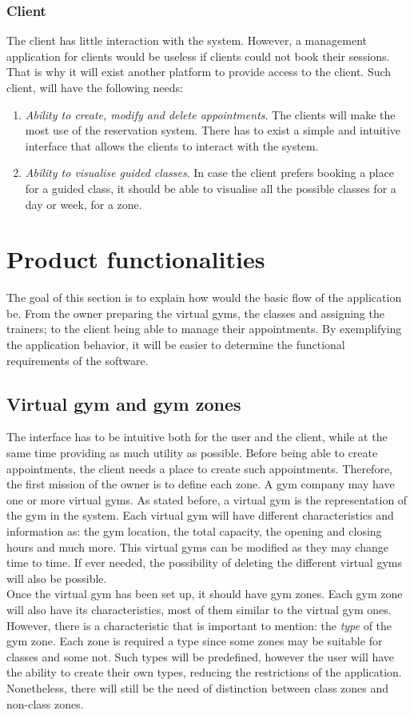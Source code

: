 \documentclass[a4paper,12pt]{book}
\begin{document}
\subsubsection{Client}
The client has little interaction with the system. However, a management application for clients would be useless if clients could not book their sessions. That is why it will exist another platform to provide access to the client. Such client, will have the following needs:
\begin{enumerate}[label = -]
	\item \emph{Ability to create, modify and delete appointments}. The clients will make the most use of the reservation system. There has to exist a simple and intuitive interface that allows the clients to interact with the system.
	\item \emph{Ability to visualise guided classes}. In case the client prefers booking a place for a guided class, it should be able to visualise all the possible classes for a day or week, for a zone.
\end{enumerate}
\section{Product functionalities}
The goal of this section is to explain how would the basic flow of the application be. From the owner preparing the virtual gyms, the classes and assigning the trainers; to the client being able to manage their appointments. By exemplifying the application behavior, it will be easier to determine the functional requirements of the software.
\subsection{Virtual gym and gym zones}
The interface has to be intuitive both for the user and the client, while at the same time providing as much utility as possible. Before being able to create appointments, the client needs a place to create such appointments. Therefore, the first mission of the owner is to define each zone. A gym company may have one or more virtual gyms. As stated before, a virtual gym is the representation of the gym in the system. Each virtual gym will have different characteristics and information as: the gym location, the total capacity, the opening and closing hours and much more. This virtual gyms can be modified as they may change time to time. If ever needed, the possibility of deleting the different virtual gyms will also be possible.
\\[8pt]
Once the virtual gym has been set up, it should have gym zones. Each gym zone will also have its characteristics, most of them similar to the virtual gym ones. However, there is a characteristic that is important to mention: the \emph{type} of the gym zone. Each zone is required a type since some zones may be suitable for classes and some not. Such types will be predefined, however the user will have the ability to create their own types, reducing the restrictions of the application. Nonetheless, there will still be the need of distinction between class zones and non-class zones.
\end{document}
